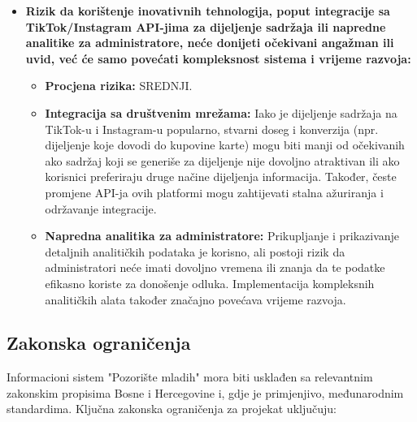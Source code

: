 \begin{itemize}
    \item \textbf{Rizik da korištenje inovativnih tehnologija, poput integracije sa TikTok/Instagram API-jima za dijeljenje sadržaja ili napredne analitike za administratore, neće donijeti očekivani angažman ili uvid, već će samo povećati kompleksnost sistema i vrijeme razvoja:}

    \begin{itemize}
        \item \textbf{Procjena rizika:} SREDNJI.

        \item \textbf{Integracija sa društvenim mrežama:} Iako je dijeljenje sadržaja na TikTok-u i Instagram-u popularno, stvarni doseg i konverzija (npr. dijeljenje koje dovodi do kupovine karte) mogu biti manji od očekivanih ako sadržaj koji se generiše za dijeljenje nije dovoljno atraktivan ili ako korisnici preferiraju druge načine dijeljenja informacija. Također, česte promjene API-ja ovih platformi mogu zahtijevati stalna ažuriranja i održavanje integracije.

        \item \textbf{Napredna analitika za administratore:} Prikupljanje i prikazivanje detaljnih analitičkih podataka je korisno, ali postoji rizik da administratori neće imati dovoljno vremena ili znanja da te podatke efikasno koriste za donošenje odluka. Implementacija kompleksnih analitičkih alata također značajno povećava vrijeme razvoja.
    \end{itemize}
\end{itemize}

\sloppy
\subsection{Zakonska ograničenja}

Informacioni sistem "Pozorište mladih" mora biti usklađen sa relevantnim zakonskim propisima Bosne i Hercegovine i, gdje je primjenjivo, međunarodnim standardima. Ključna zakonska ograničenja za projekat uključuju:

